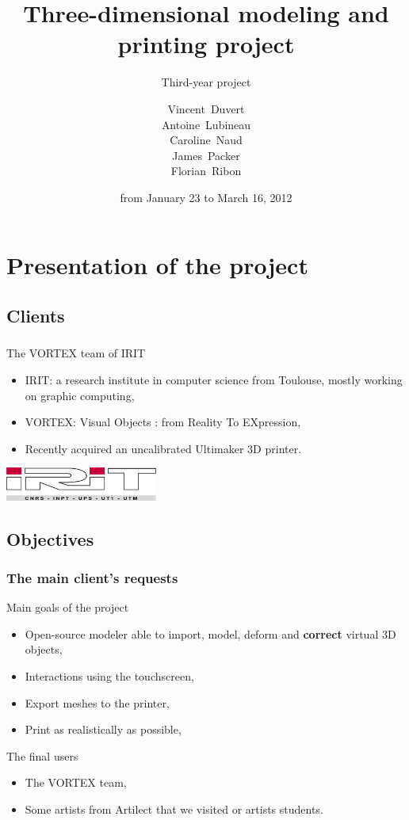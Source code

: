 \documentclass{beamer}
\title{Three-dimensional modeling and printing project}
\subtitle{Third-year project}
\author[V. Duvert, A. Lubineau, C. Naud, J. Packer, F. Ribon]{\scriptsize
Vincent~Duvert \\ Antoine~Lubineau \\ Caroline~Naud \\ James~Packer \\ Florian~Ribon}
\date{from January 23 to March 16, 2012}
\begin{document}
\frame{\titlepage}

\section{Presentation of the project}

\subsection{Clients}
\begin{frame}
	\frametitle{}
	
	\begin{block}{The VORTEX team of IRIT}
		\begin{itemize}
		\item IRIT: a research institute in computer science from Toulouse, mostly working on graphic computing,
		\item VORTEX: Visual Objects : from Reality To EXpression,
		\item Recently acquired an uncalibrated Ultimaker 3D printer.
		\end{itemize}
    \end{block}
    
    \begin{center}
		\includegraphics[width=5cm]{irit}
	\end{center}
    
\end{frame}

\subsection{Objectives}
\begin{frame}
	\frametitle{The main client's requests}
	\begin{block}{Main goals of the project} 
	\begin{itemize}
		\item Open-source modeler able to import, model, deform and \textbf{correct} virtual 3D objects,
		\item Interactions using the touchscreen,
		\item Export meshes to the printer,
		\item Print as realistically as possible,
	\end{itemize}
    \end{block}
    
    \begin{block}{The final users}
    	\begin{itemize}
		\item The VORTEX team,
		\item Some artists from Artilect that we visited or artists students.
		\end{itemize}
    \end{block}

\end{frame}
\end{document}
